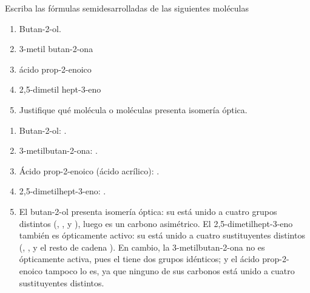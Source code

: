 \begin{exerciseEVAU}
    Escriba las fórmulas semidesarrolladas de las siguientes moléculas

    \begin{enumerate}[label=\letraminuscula]
        \item Butan-2-ol.
        \item 3-metil butan-2-ona
        \item ácido prop-2-enoico
        \item 2,5-dimetil hept-3-eno
        \item Justifique qué molécula o moléculas presenta isomería óptica.
    \end{enumerate}

    \begin{solu}


        \begin{enumerate}[label=\letraminuscula]
            \item Butan-2-ol: .
            \item 3-metilbutan-2-ona: .
            \item Ácido prop-2-enoico (ácido acrílico): .
            \item 2,5-dimetilhept-3-eno: .
            \item El butan-2-ol presenta isomería óptica: su  está unido a cuatro grupos distintos (, ,  y ), luego es un carbono asimétrico. El 2,5-dimetilhept-3-eno también es ópticamente activo: su  está unido a cuatro sustituyentes distintos (, ,  y el resto de cadena ). En cambio, la 3-metilbutan-2-ona no es ópticamente activa, pues el  tiene dos grupos  idénticos; y el ácido prop-2-enoico tampoco lo es, ya que ninguno de sus carbonos está unido a cuatro sustituyentes distintos.
        \end{enumerate}
    \end{solu}
\end{exerciseEVAU}

